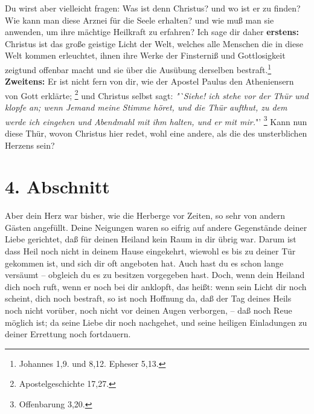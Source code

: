 Du wirst aber vielleicht fragen: Was ist denn Christus? und wo ist er zu finden?
Wie kann man diese Arznei für die Seele erhalten? und wie muß man sie anwenden,
um ihre mächtige Heilkraft zu erfahren? Ich sage dir daher \textbf{erstens:}
Christus ist das große geistige Licht der Welt, welches alle Menschen die in
diese Welt kommen erleuchtet, ihnen ihre Werke der Finsterniß und Gottlosigkeit
zeigtund offenbar macht und sie über die Ausübung derselben
bestraft.\footnote{Johannes 1,9. und 8,12. Epheser 5,13.}
\textbf{Zweitens:} Er ist nicht fern von dir, wie der
Apostel Paulus den Atheniensern von Gott erklärte;
\footnote{Apostelgeschichte 17,27.}
und Christus selbst sagt:
\textit{"`Siehe! ich stehe vor der Thür und klopfe an;
wenn Jemand meine Stimme höret, und die Thür aufthut, zu dem werde ich eingehen
und Abendmahl mit ihm halten, und er mit mir.}"'
\footnote{Offenbarung 3,20.}
Kann 
nun diese Thür, wovon Christus hier redet, wohl eine andere, als die des
unsterblichen Herzens sein?

\section{4. Abschnitt}  \label{kap2_ab4}

Aber dein Herz war bisher, wie die Herberge vor Zeiten, so sehr von andern
Gästen angefüllt. Deine Neigungen waren so eifrig auf andere Gegenstände deiner
Liebe gerichtet, daß für deinen Heiland kein Raum in dir übrig war. Darum ist
dass Heil noch nicht in deinem Hause eingekehrt, wiewohl es bis zu deiner Tür
gekommen ist, und sich dir oft angeboten hat. Auch hast du es schon lange
versäumt -- obgleich du es zu besitzen vorgegeben hast. Doch, wenn dein Heiland
dich noch ruft, wenn er noch bei dir anklopft, das heißt: wenn sein Licht dir
noch scheint, dich noch bestraft, so ist noch Hoffnung da, daß der Tag deines
Heils noch nicht vorüber, noch nicht vor deinen Augen verborgen, -- daß noch
Reue
möglich ist; da seine Liebe dir noch nachgehet, und seine heiligen Einladungen
zu deiner Errettung noch fortdauern.

